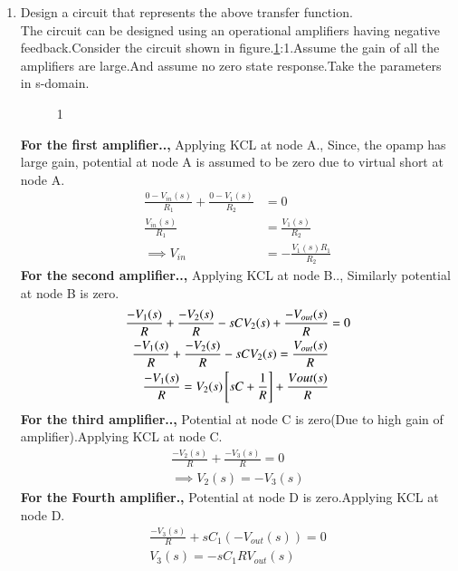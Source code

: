 \begin{enumerate}[label=\thesubsection.\arabic*.,ref=\thesubsection.\theenumi]
\item Design a circuit that represents the above transfer function.\\
\solution The circuit can be designed using an operational amplifiers having negative feedback.Consider the circuit shown in figure.\ref{fig:equivalent_control_system}:1.Assume the gain of all the amplifiers are large.And assume no zero state response.Take the parameters in s-domain.\\
\begin{figure}[!hbt]
	\begin{center}
			\resizebox{\columnwidth}{!}{}
	\end{center}
\caption{1}
\label{fig:equivalent_control_system}
\end{figure}
\textbf{For the first amplifier..,}
Applying KCL at node A., 
Since, the opamp has large gain, potential at node A is assumed to be zero due to virtual short at node A.
\begin{align}
    \frac{0-V_{in}(s)}{R_1} +\frac{0-V_1(s)}{R_2} &= 0\\
    \frac{V_{in}(s)}{R_1} &= \frac{V_1(s)}{R_2}\\
\implies V_{in} &= -\frac{V_1(s) R_1}{R_2}\label{eq:opamp_1}
\end{align}
\textbf{For the second amplifier..,}
Applying KCL at node B..,
Similarly potential at node B is zero.
\begin{align}
  \frac{-V_1(s)}{R}+\frac{-V_2(s)}{R}-sCV_2(s)+\frac{-V_{out}(s)}{R} &= 0\\
  \frac{-V_1(s)}{R}+\frac{-V_2(s)}{R}-sCV_2(s) = \frac{V_{out}(s)}{R} \\
  \frac{-V_1(s)}{R} = V_2(s){}\left[sC+\frac{1}{R}\right]+\frac{V{out}(s)}{R} \label{eq:opamp_2}
\end{align}
\textbf{For the third amplifier..,}
Potential at node C is zero(Due to high gain of amplifier).Applying KCL at node C.
\begin{align}
    \frac{-V_2(s)}{R}+\frac{-V_3(s)}{R} = 0\\
    \implies V_2(s) = -V_3(s) \label{eq:opamp_3}
\end{align}
\textbf{For the Fourth amplifier.,}
Potential at node D is zero.Applying KCL at node D.
\begin{align}
    \frac{-V_3(s)}{R}+sC_1(-V_{out}(s)) = 0\\
    V_3(s) = -sC_1RV_{out}(s) \label{eq:opamp_4}
\end{align}

\end{enumerate}
